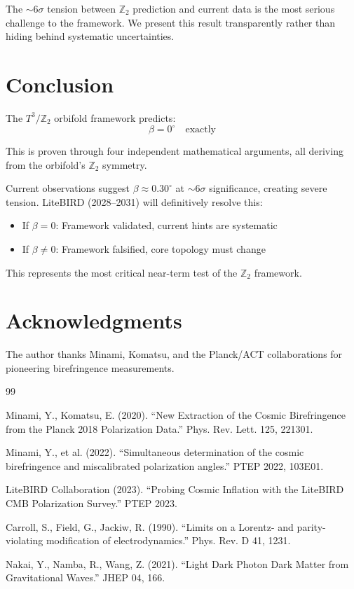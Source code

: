 \documentclass[12pt,a4paper]{article}
\begin{document}
The $\sim 6\sigma$ tension between $\mathbb{Z}_2$ prediction and current data is the most serious challenge to the framework. We present this result transparently rather than hiding behind systematic uncertainties.

\section{Conclusion}

The $T^3/\mathbb{Z}_2$ orbifold framework predicts:
\begin{equation}
\beta = 0^\circ \quad \text{exactly}
\end{equation}

This is proven through four independent mathematical arguments, all deriving from the orbifold's $\mathbb{Z}_2$ symmetry.

Current observations suggest $\beta \approx 0.30^\circ$ at $\sim 6\sigma$ significance, creating severe tension. LiteBIRD (2028--2031) will definitively resolve this:
\begin{itemize}
    \item If $\beta = 0$: Framework validated, current hints are systematic
    \item If $\beta \neq 0$: Framework falsified, core topology must change
\end{itemize}

This represents the most critical near-term test of the $\mathbb{Z}_2$ framework.

\section*{Acknowledgments}

The author thanks Minami, Komatsu, and the Planck/ACT collaborations for pioneering birefringence measurements.

\begin{thebibliography}{99}

Minami, Y., Komatsu, E. (2020). ``New Extraction of the Cosmic Birefringence from the Planck 2018 Polarization Data.'' Phys. Rev. Lett. 125, 221301.

Minami, Y., et al. (2022). ``Simultaneous determination of the cosmic birefringence and miscalibrated polarization angles.'' PTEP 2022, 103E01.

LiteBIRD Collaboration (2023). ``Probing Cosmic Inflation with the LiteBIRD CMB Polarization Survey.'' PTEP 2023.

Carroll, S., Field, G., Jackiw, R. (1990). ``Limits on a Lorentz- and parity-violating modification of electrodynamics.'' Phys. Rev. D 41, 1231.

Nakai, Y., Namba, R., Wang, Z. (2021). ``Light Dark Photon Dark Matter from Gravitational Waves.'' JHEP 04, 166.

\end{thebibliography}
\end{document}
